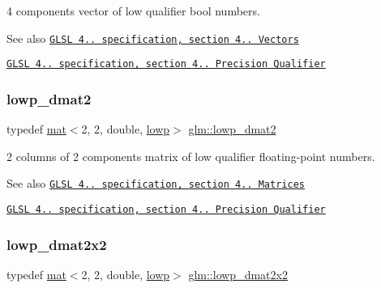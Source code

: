 4 components vector of low qualifier bool numbers.

\begin{DoxySeeAlso}{See also}
\href{http://www.opengl.org/registry/doc/GLSLangSpec.4.20.8.pdf}{\tt G\+L\+SL 4.. specification, section 4.. Vectors} 

\href{http://www.opengl.org/registry/doc/GLSLangSpec.4.20.8.pdf}{\tt G\+L\+SL 4.. specification, section 4.. Precision Qualifier} 
\end{DoxySeeAlso}
\mbox{\label{group__core__precision_gaf2d0890fdba0e76d2bd2a169c1a71b00}} 
\subsubsection{\texorpdfstring{lowp\+\_\+dmat2}{lowp\_dmat2}}
{\footnotesize\ttfamily typedef \hyperlink{structglm_1_1mat}{mat}$<$2, 2, double, \hyperlink{namespaceglm_a36ed105b07c7746804d7fdc7cc90ff25ae161af3fc695e696ce3bf69f7332bc2d}{lowp}$>$ \hyperlink{group__core__precision_gaf2d0890fdba0e76d2bd2a169c1a71b00}{glm\+::lowp\+\_\+dmat2}}

2 columns of 2 components matrix of low qualifier floating-\/point numbers.

\begin{DoxySeeAlso}{See also}
\href{http://www.opengl.org/registry/doc/GLSLangSpec.4.20.8.pdf}{\tt G\+L\+SL 4.. specification, section 4.. Matrices} 

\href{http://www.opengl.org/registry/doc/GLSLangSpec.4.20.8.pdf}{\tt G\+L\+SL 4.. specification, section 4.. Precision Qualifier} 
\end{DoxySeeAlso}
\mbox{\label{group__core__precision_gaa0f01b1fb1a32ca63036ee3de89681d4}} 
\subsubsection{\texorpdfstring{lowp\+\_\+dmat2x2}{lowp\_dmat2x2}}
{\footnotesize\ttfamily typedef \hyperlink{structglm_1_1mat}{mat}$<$2, 2, double, \hyperlink{namespaceglm_a36ed105b07c7746804d7fdc7cc90ff25ae161af3fc695e696ce3bf69f7332bc2d}{lowp}$>$ \hyperlink{group__core__precision_gaa0f01b1fb1a32ca63036ee3de89681d4}{glm\+::lowp\+\_\+dmat2x2}}

